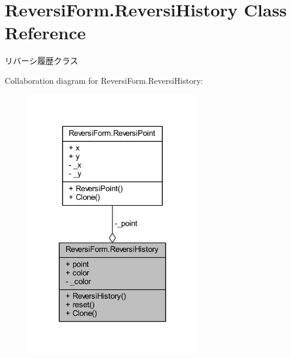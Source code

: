\hypertarget{class_reversi_form_1_1_reversi_history}{}\section{Reversi\+Form.\+Reversi\+History Class Reference}
\label{class_reversi_form_1_1_reversi_history}


リバーシ履歴クラス  




Collaboration diagram for Reversi\+Form.\+Reversi\+History\+:
\nopagebreak
\begin{figure}[H]
\begin{center}
\leavevmode
\includegraphics[width=216pt]{class_reversi_form_1_1_reversi_history__coll__graph}
\end{center}
\end{figure}
